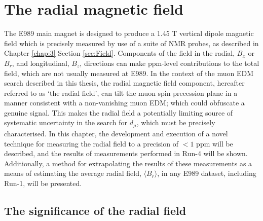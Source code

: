 \chapter{The radial magnetic field}\label{chap:4}

The E989 main magnet is designed to produce a 1.45 T vertical dipole magnetic field which is precisely measured by use of a suite of NMR probes, as described in Chapter \ref{chap:3} Section \ref{sec:Field}. Components of the field in the radial, $B_{x}$ or $B_{r}$, and longitudinal, $B_{z}$, directions can make ppm-level contributions to the total field, which are not usually measured at E989. In the context of the muon EDM search described in this thesis, the radial magnetic field component, hereafter referred to as `the radial field', can tilt the muon spin precession plane in a manner consistent with a non-vanishing muon EDM; which could obfuscate a genuine signal. This makes the radial field a potentially limiting source of systematic uncertainty in the search for $d_{\mu}$, which must be precisely characterised. In this chapter, the development and execution of a novel technique for measuring the radial field to a precision of $<1$ ppm will be described, and the results of measurements performed in Run-4 will be shown. Additionally, a method for extrapolating the results of these measurements as a means of estimating the average radial field, $\langle B_{r} \rangle$, in any E989 dataset, including Run-1, will be presented.

\section{The significance of the radial field}

